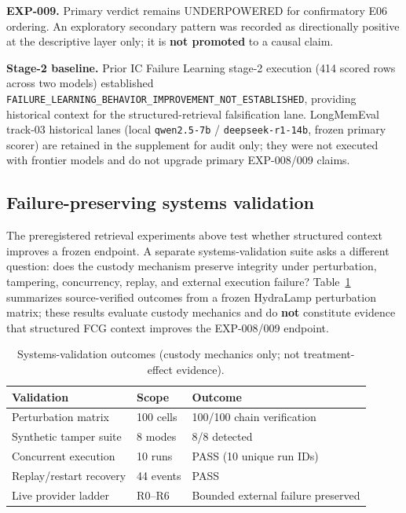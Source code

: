\documentclass{article}
\begin{document}
\textbf{EXP-009.} Primary verdict remains UNDERPOWERED for confirmatory E06 ordering. An exploratory secondary pattern was recorded as directionally positive at the descriptive layer only; it is \textbf{not promoted} to a causal claim.

\textbf{Stage-2 baseline.} Prior IC Failure Learning stage-2 execution (414 scored rows across two models) established \texttt{FAILURE\_LEARNING\_BEHAVIOR\_IMPROVEMENT\_NOT\_ESTABLISHED}, providing historical context for the structured-retrieval falsification lane.
LongMemEval track-03 historical lanes (local \texttt{qwen2.5-7b} / \texttt{deepseek-r1-14b}, frozen primary scorer) are retained in the supplement for audit only; they were not executed with frontier models and do not upgrade primary EXP-008/009 claims.

\subsection{Failure-preserving systems validation}

The preregistered retrieval experiments above test whether structured context improves a frozen endpoint.
A separate systems-validation suite asks a different question: does the custody mechanism preserve integrity under perturbation, tampering, concurrency, replay, and external execution failure?
Table~\ref{tab:systems} summarizes source-verified outcomes from a frozen HydraLamp perturbation matrix; these results evaluate custody mechanics and do \textbf{not} constitute evidence that structured FCG context improves the EXP-008/009 endpoint.

\begin{table}[t]
  \centering
  \caption{Systems-validation outcomes (custody mechanics only; not treatment-effect evidence).}
  \label{tab:systems}
  \begin{tabular}{lll}
    \toprule
    Validation & Scope & Outcome \\
    \midrule
    Perturbation matrix & 100 cells & 100/100 chain verification \\
    Synthetic tamper suite & 8 modes & 8/8 detected \\
    Concurrent execution & 10 runs & PASS (10 unique run IDs) \\
    Replay/restart recovery & 44 events & PASS \\
    Live provider ladder & R0--R6 & Bounded external failure preserved \\
    \bottomrule
  \end{tabular}
\end{table}
\end{document}
